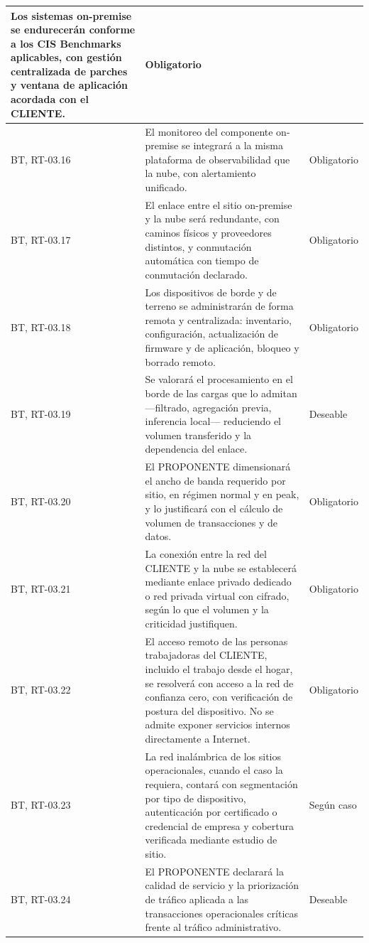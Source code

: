 \begin{longtable}{|L{0.098425\AnchoTablaAnexo}|L{0.814961\AnchoTablaAnexo}|L{0.086614\AnchoTablaAnexo}|}
Los sistemas on-premise se endurecerán conforme a los CIS Benchmarks aplicables, con gestión centralizada de parches y ventana de aplicación acordada con el CLIENTE. &
Obligatorio \\ \hline
BT, RT-03.16 &
El monitoreo del componente on-premise se integrará a la misma plataforma de observabilidad que la nube, con alertamiento unificado. &
Obligatorio \\ \hline
{}
BT, RT-03.17 &
El enlace entre el sitio on-premise y la nube será redundante, con caminos físicos y proveedores distintos, y conmutación automática con tiempo de conmutación declarado. &
Obligatorio \\ \hline
BT, RT-03.18 &
Los dispositivos de borde y de terreno se administrarán de forma remota y centralizada: inventario, configuración, actualización de firmware y de aplicación, bloqueo y borrado remoto. &
Obligatorio \\ \hline
{}
BT, RT-03.19 &
Se valorará el procesamiento en el borde de las cargas que lo admitan —filtrado, agregación previa, inferencia local— reduciendo el volumen transferido y la dependencia del enlace. &
Deseable \\ \hline
BT, RT-03.20 &
El PROPONENTE dimensionará el ancho de banda requerido por sitio, en régimen normal y en peak, y lo justificará con el cálculo de volumen de transacciones y de datos. &
Obligatorio \\ \hline
{}
BT, RT-03.21 &
La conexión entre la red del CLIENTE y la nube se establecerá mediante enlace privado dedicado o red privada virtual con cifrado, según lo que el volumen y la criticidad justifiquen. &
Obligatorio \\ \hline
BT, RT-03.22 &
El acceso remoto de las personas trabajadoras del CLIENTE, incluido el trabajo desde el hogar, se resolverá con acceso a la red de confianza cero, con verificación de postura del dispositivo. No se admite exponer servicios internos directamente a Internet. &
Obligatorio \\ \hline
{}
BT, RT-03.23 &
La red inalámbrica de los sitios operacionales, cuando el caso la requiera, contará con segmentación por tipo de dispositivo, autenticación por certificado o credencial de empresa y cobertura verificada mediante estudio de sitio. &
Según caso \\ \hline
BT, RT-03.24 &
El PROPONENTE declarará la calidad de servicio y la priorización de tráfico aplicada a las transacciones operacionales críticas frente al tráfico administrativo. &
Deseable \\ \hline
\end{longtable}

